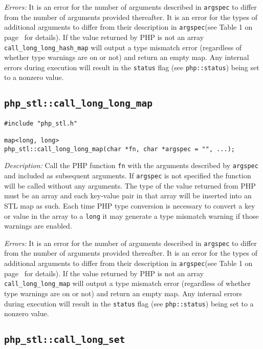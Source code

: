 \documentclass[11pt,titlepage]{article}
\begin{document}
\emph{Errors:} It is an error for the number of arguments described in \verb|argspec| to differ from the number of arguments provided thereafter. It is an error for the types of additional arguments to differ from their description in \verb|argspec|(see Table 1 on page~\pageref{Table1} for details). If the value returned by PHP is not an array \verb|call_long_long_hash_map| will output a type mismatch error (regardless of whether type warnings are on or not) and return an empty map. Any internal errors during execution will result in the \verb|status| flag (see \verb|php::status|) being set to a nonzero value.


\subsection{\texttt{php\_stl::call\_long\_long\_map}}

\begin{verbatim}
#include "php_stl.h"

map<long, long> 
php_stl::call_long_long_map(char *fn, char *argspec = "", ...);
\end{verbatim}

\emph{Description:} Call the PHP function \verb|fn| with the arguments described by \verb|argspec| and included as subsequent arguments. If \verb|argspec| is not specified the function will be called without any arguments. The type of the value returned from PHP must be an array and each key-value pair in that array will be inserted into an STL map as such. Each time PHP type conversion is necessary to convert a key or value in the array to a \verb|long| it may generate a type mismatch warning if those warnings are enabled.

\emph{Errors:} It is an error for the number of arguments described in \verb|argspec| to differ from the number of arguments provided thereafter. It is an error for the types of additional arguments to differ from their description in \verb|argspec|(see Table 1 on page~\pageref{Table1} for details). If the value returned by PHP is not an array \verb|call_long_long_map| will output a type mismatch error (regardless of whether type warnings are on or not) and return an empty map. Any internal errors during execution will result in the \verb|status| flag (see \verb|php::status|) being set to a nonzero value.


\subsection{\texttt{php\_stl::call\_long\_set}}
\end{document}
